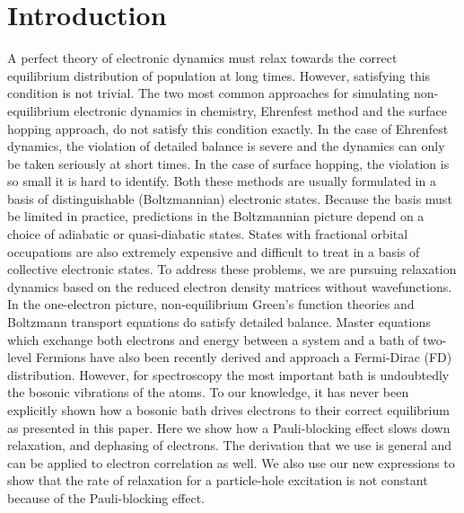 \documentclass[aip,jcp,preprint,floatfix]{revtex4-1}
\begin{document}
{\section{Introduction}
\indent     A perfect theory of electronic dynamics must relax towards the correct equilibrium distribution of population at long times. However, satisfying this condition is not trivial. The two most common approaches for simulating non-equilibrium electronic dynamics in chemistry, Ehrenfest method and the surface hopping approach, do not satisfy this condition exactly. In the case of Ehrenfest dynamics, the violation of detailed balance is severe\cite{Ehrenfest} and the dynamics can only be taken seriously at short times. In the case of surface hopping, the violation is so small it is hard to identify\cite{shdetbal}. Both these methods are usually formulated in a basis of distinguishable (Boltzmannian) electronic states. Because the basis must be limited in practice, predictions in the Boltzmannian picture depend on a choice of adiabatic or quasi-diabatic states. States with fractional orbital occupations are also extremely expensive and difficult to treat in a basis of collective electronic states. To address these problems, we are pursuing relaxation dynamics based on the reduced electron density matrices without wavefunctions.\\
\indent   In the one-electron picture, non-equilibrium Green's function theories\cite{PhysRevC.58.1594,PhysRevB.46.4757,Semkat,neqGF} and Boltzmann transport equations\cite{Boltzz,erpa} do satisfy detailed balance. Master equations which exchange both electrons and energy between a system and a bath of two-level Fermions have also been recently derived and approach a Fermi-Dirac (FD) distribution\cite{PhysRevA.90.022123,2014arXiv1410.0304S}. However, for spectroscopy the most important bath is undoubtedly the bosonic vibrations of the atoms\cite{PhysRevB.89.085202}. To our knowledge, it has never been explicitly shown how a bosonic bath drives electrons to their correct equilibrium as presented in this paper. Here we show how a Pauli-blocking effect slows down relaxation, and dephasing of electrons. The derivation that we use is general and can be applied to electron correlation as well. We also use our new expressions to show that the rate of relaxation for a particle-hole excitation is not constant because of the Pauli-blocking effect. \\
}
\end{document}
